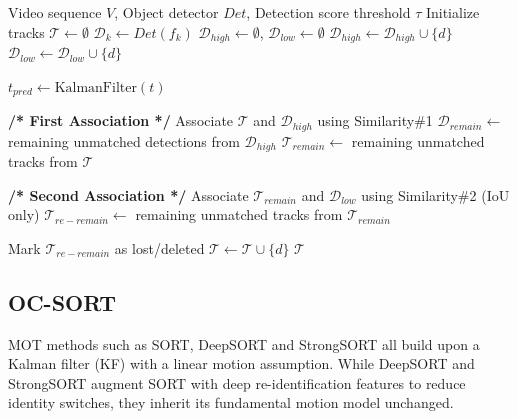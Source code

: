 \documentclass[10pt,twocolumn,letterpaper]{article}
\begin{document}
\begin{algorithm}[H]
\caption{BYTE Association Strategy}
\begin{algorithmic}[1]
\Require Video sequence $V$, Object detector $Det$, Detection score threshold $\tau$
\State Initialize tracks $\mathcal{T} \gets \emptyset$
    \State $\mathcal{D}_k \gets Det(f_k)$
    \State $\mathcal{D}_{high} \gets \emptyset$, $\mathcal{D}_{low} \gets \emptyset$
            \State $\mathcal{D}_{high} \gets \mathcal{D}_{high} \cup \{d\}$
        \Else
            \State $\mathcal{D}_{low} \gets \mathcal{D}_{low} \cup \{d\}$
        \EndIf
    \EndFor
    
        \State $t_{pred} \gets \text{KalmanFilter}(t)$ 
    \EndFor
    
    \State \textbf{/* First Association */}
    \State Associate $\mathcal{T}$ and $\mathcal{D}_{high}$ using Similarity\#1
    \State $\mathcal{D}_{remain} \gets$ remaining unmatched detections from $\mathcal{D}_{high}$
    \State $\mathcal{T}_{remain} \gets$ remaining unmatched tracks from $\mathcal{T}$
    
    \State \textbf{/* Second Association */}
    \State Associate $\mathcal{T}_{remain}$ and $\mathcal{D}_{low}$ using Similarity\#2 (IoU only)
    \State $\mathcal{T}_{re-remain} \gets$ remaining unmatched tracks from $\mathcal{T}_{remain}$
    
    \State Mark $\mathcal{T}_{re-remain}$ as lost/deleted
        \State $\mathcal{T} \gets \mathcal{T} \cup \{d\}$ 
    \EndFor
\EndFor
\State \Return $\mathcal{T}$
\end{algorithmic}
\end{algorithm}















\subsection{OC-SORT}
MOT methods such as SORT, DeepSORT and StrongSORT all build upon a Kalman filter (KF) with a linear motion assumption. While DeepSORT and StrongSORT augment SORT with deep re-identification features to reduce identity switches, they inherit its fundamental motion model unchanged. 
\end{document}

